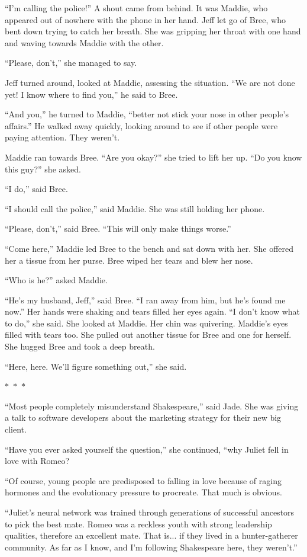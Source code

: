 \documentclass{memoir}
\newcommand{\starbreak}{%
\begin{center}
  $\ast$~$\ast$~$\ast$
\end{center}
}
\begin{document}
``I'm calling the police!'' A shout came from behind. It was Maddie, who appeared out of nowhere with the phone in her hand. Jeff let go of Bree, who bent down trying to catch her breath. She was gripping her throat with one hand and waving towards Maddie with the other. 

``Please, don't,'' she managed to say.

Jeff turned around, looked at Maddie, assessing the situation. ``We are not done yet! I know where to find you,'' he said to Bree. 

``And you,'' he turned to Maddie, ``better not stick your nose in other people's affairs.'' He walked away quickly, looking around to see if other people were paying attention. They weren't.

Maddie ran towards Bree. ``Are you okay?'' she tried to lift her up. ``Do you know this guy?'' she asked.

``I do,'' said Bree. 

``I should call the police,'' said Maddie. She was still holding her phone.

``Please, don't,'' said Bree. ``This will only make things worse.''

``Come here,'' Maddie led Bree to the bench and sat down with her. She offered her a tissue from her purse. Bree wiped her tears and blew her nose.

``Who is he?'' asked Maddie.

``He's my husband, Jeff,'' said Bree. ``I ran away from him, but he's found me now.'' Her hands were shaking and tears filled her eyes again. ``I don't know what to do,'' she said. She looked at Maddie. Her chin was quivering. Maddie's eyes filled with tears too. She pulled out another tissue for Bree and one for herself. She hugged Bree and took a deep breath. 

``Here, here. We'll figure something out,'' she said. 

\starbreak

``Most people completely misunderstand Shakespeare,'' said Jade. She was giving a talk to software developers about the marketing strategy for their new big client. 

``Have you ever asked yourself the question,'' she continued, ``why Juliet fell in love with Romeo? 

``Of course, young people are predisposed to falling in love because of raging hormones and the evolutionary pressure to procreate. That much is obvious.

``Juliet's neural network was trained through generations of successful ancestors to pick the best mate. Romeo was a reckless youth with strong leadership qualities, therefore an excellent mate. That is... if they lived in a hunter-gatherer community. As far as I know, and I'm following Shakespeare here, they weren't.'' 
\end{document}
